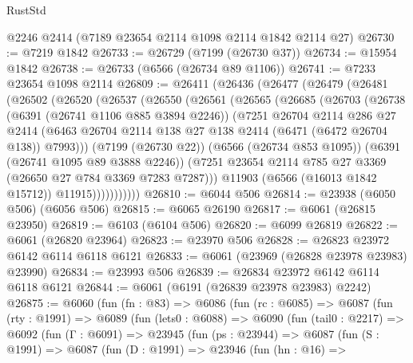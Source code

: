 \begin{lexlean}{RustStd}
\begin{coremodule}
{\begin{coremodule}
{{{{{{{{{{{{{{{{{{{{{{{{{{    @2246
    @2414
    (@7189 @23654 @2114 @1098 @2114 @1842 @2114 @27)
@26730 := @7219 @1842
@26733 := @26729 (@7199 (@26730 @37))
@26734 := @15954 @1842
@26738 := @26733 (@6566 (@26734 @89 @1106))
@26741 := @7233 @23654 @1098 @2114
@26809 := @26411
    (@26436
      (@26477
        (@26479
          (@26481
            (@26502
              (@26520
                (@26537
                  (@26550
                    (@26561
                      (@26565
                        (@26685
                          (@26703
                            (@26738
                              (@6391 (@26741 @1106 @885 @3894 @2246))
                              (@7251
                                @26704
                                @2114
                                @286
                                @27
                                @2414
                                (@6463
                                  @26704
                                  @2114
                                  @138
                                  @27
                                  @138
                                  @2414
                                  (@6471 (@6472 @26704 @138))
                                  @7993)))
                            (@7199 (@26730 @22))
                            (@6566 (@26734 @853 @1095))
                            (@6391 (@26741 @1095 @89 @3888 @2246))
                            (@7251 @23654 @2114 @785 @27 @3369 (@26650 @27 @784 @3369 @7283 @7287)))
                          @11903
                          (@6566 (@16013 @1842 @15712))
                          @11915)))))))))))
@26810 := @6044 @506
@26814 := @23938 (@6050 @506) (@6056 @506)
@26815 := @6065 @26190
@26817 := @6061 (@26815 @23950)
@26819 := @6103 (@6104 @506)
@26820 := @6099 @26819
@26822 := @6061 (@26820 @23964)
@26823 := @23970 @506
@26828 := @26823 @23972 @6142 @6114 @6118 @6121
@26833 := @6061 (@23969 (@26828 @23978 @23983) @23990)
@26834 := @23993 @506
@26839 := @26834 @23972 @6142 @6114 @6118 @6121
@26844 := @6061 (@6191 (@26839 @23978 @23983) @2242)
@26875 := @6060
    (fun (fn : @83) =>
    @6086
      (fun (rc : @6085) =>
      @6087
        (fun (rty : @1991) =>
        @6089
          (fun (lets0 : @6088) =>
          @6090
            (fun (tail0 : @2217) =>
            @6092
              (fun (Γ : @6091) =>
              @23945
                (fun (ps : @23944) =>
                @6087
                  (fun (S : @1991) =>
                  @6087
                    (fun (D : @1991) =>
                    @23946
                      (fun (hn : @16) =>
}}}}}}}}}}}}}}}}}}}}}}}}}}
\end{coremodule}}
\end{coremodule}
\end{lexlean}

